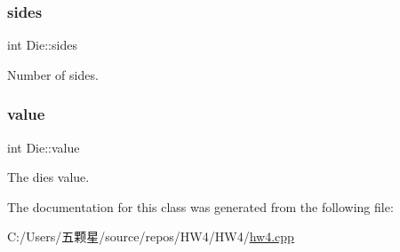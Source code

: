 \subsubsection{\texorpdfstring{sides}{sides}}
{\footnotesize\ttfamily int Die\+::sides\hspace{0.3cm}{\ttfamily [private]}}

Number of sides. \mbox{\label{class_die_a1d3d92c57a6d515d93162af0ca6b3e1d}} 
\subsubsection{\texorpdfstring{value}{value}}
{\footnotesize\ttfamily int Die\+::value\hspace{0.3cm}{\ttfamily [private]}}

The die\textquotesingle{}s value. 

The documentation for this class was generated from the following file\+:\begin{DoxyCompactItemize}
\item 
C\+:/\+Users/五颗星/source/repos/\+H\+W4/\+H\+W4/\mbox{\hyperlink{hw4_8cpp}{hw4.\+cpp}}\end{DoxyCompactItemize}
